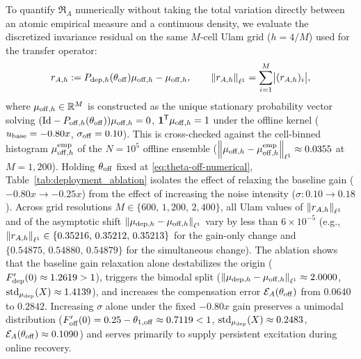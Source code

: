 To quantify $\mathfrak{R}_A$ numerically without taking the total variation directly between an atomic empirical measure and a continuous density, we evaluate the discretized invariance residual on the same $M$-cell Ulam grid ($h = 4/M$) used for the transfer operator:
\begin{equation}
    r_{A,h} := P_{{\rm dep},h}(\theta_{\rm off})\mu_{{\rm off},h} - \mu_{{\rm off},h},
    \qquad
    \left\lVert r_{A,h}\right\rVert_{\ell^1} = \sum_{i=1}^M \bigl|(r_{A,h})_i\bigr|,
    \label{eq:discretized-rA}
\end{equation}
where $\mu_{{\rm off},h} \in \mathbb{R}^M$ is constructed as the unique stationary probability vector solving $(\mathrm{Id} - P_{{\rm off},h}(\theta_{\rm off}))\mu_{{\rm off},h}=0$, $\mathbf{1}^{\mathsf T}\mu_{{\rm off},h}=1$ under the offline kernel ($u_{\rm base}=-0.80x$, $\sigma_{\rm off}=0.10$). This is cross-checked against the cell-binned histogram $\mu_{{\rm off},h}^{\rm emp}$ of the $N=10^5$ offline ensemble ($\left\lVert \mu_{{\rm off},h}-\mu_{{\rm off},h}^{\rm emp}\right\rVert_{\ell^1} \approx 0.0355$ at $M=1{,}200$). Holding $\theta_{\rm off}$ fixed at \eqref{eq:theta-off-numerical}, Table~\ref{tab:deployment_ablation} isolates the effect of relaxing the baseline gain ($-0.80x \to -0.25x$) from the effect of increasing the noise intensity ($\sigma: 0.10 \to 0.18$). Across grid resolutions $M \in \{600,\, 1{,}200,\, 2{,}400\}$, all Ulam values of $\left\lVert r_{A,h}\right\rVert_{\ell^1}$ and of the asymptotic shift $\left\lVert \mu_{{\rm dep},h}-\mu_{{\rm off},h}\right\rVert_{\ell^1}$ vary by less than $6\times 10^{-5}$ (e.g., $\left\lVert r_{A,h}\right\rVert_{\ell^1} \in \{0.35216,\, 0.35212,\, 0.35213\}$ for the gain-only change and $\{0.54875,\, 0.54880,\, 0.54879\}$ for the simultaneous change). The ablation shows that the baseline gain relaxation alone destabilizes the origin ($F_{\rm dep}'(0)\approx 1.2619>1$), triggers the bimodal split ($\left\lVert \mu_{{\rm dep},h}-\mu_{{\rm off},h}\right\rVert_{\ell^1}\approx 2.0000$, $\operatorname{std}_{\mu_{\rm dep}}(X)\approx 1.4139$), and increases the compensation error $\mathcal{E}_A(\theta_{\rm off})$ from $0.0640$ to $0.2842$. Increasing $\sigma$ alone under the fixed $-0.80x$ gain preserves a unimodal distribution ($F_{\rm off}'(0) = 0.25-\theta_{1,\rm off} \approx 0.7119 < 1$, $\operatorname{std}_{\mu_{\rm dep}}(X)\approx 0.2483$, $\mathcal{E}_A(\theta_{\rm off})\approx 0.1090$) and serves primarily to supply persistent excitation during online recovery.

